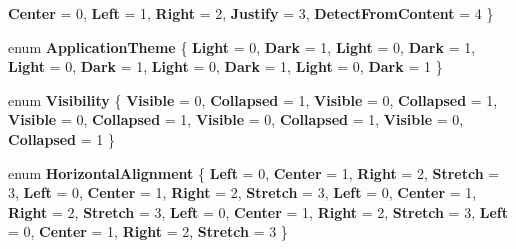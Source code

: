 \begin{DoxyCompactItemize}
{\bfseries Center} = 0, 
{\bfseries Left} = 1, 
{\bfseries Right} = 2, 
{\bfseries Justify} = 3, 
\newline
{\bfseries Detect\+From\+Content} = 4
 \}
\item 
\mbox{\label{namespace_windows_1_1_u_i_1_1_xaml_ace78659e508744cb10b2d252833ef022}} 
enum {\bfseries Application\+Theme} \{ \newline
{\bfseries Light} = 0, 
{\bfseries Dark} = 1, 
{\bfseries Light} = 0, 
{\bfseries Dark} = 1, 
\newline
{\bfseries Light} = 0, 
{\bfseries Dark} = 1, 
{\bfseries Light} = 0, 
{\bfseries Dark} = 1, 
\newline
{\bfseries Light} = 0, 
{\bfseries Dark} = 1
 \}
\item 
\mbox{\label{namespace_windows_1_1_u_i_1_1_xaml_ab3fbc626243929a7adbc7f2170933135}} 
enum {\bfseries Visibility} \{ \newline
{\bfseries Visible} = 0, 
{\bfseries Collapsed} = 1, 
{\bfseries Visible} = 0, 
{\bfseries Collapsed} = 1, 
\newline
{\bfseries Visible} = 0, 
{\bfseries Collapsed} = 1, 
{\bfseries Visible} = 0, 
{\bfseries Collapsed} = 1, 
\newline
{\bfseries Visible} = 0, 
{\bfseries Collapsed} = 1
 \}
\item 
\mbox{\label{namespace_windows_1_1_u_i_1_1_xaml_a296d6e339e45f69b5f76a1183a51fef6}} 
enum {\bfseries Horizontal\+Alignment} \{ \newline
{\bfseries Left} = 0, 
{\bfseries Center} = 1, 
{\bfseries Right} = 2, 
{\bfseries Stretch} = 3, 
\newline
{\bfseries Left} = 0, 
{\bfseries Center} = 1, 
{\bfseries Right} = 2, 
{\bfseries Stretch} = 3, 
\newline
{\bfseries Left} = 0, 
{\bfseries Center} = 1, 
{\bfseries Right} = 2, 
{\bfseries Stretch} = 3, 
\newline
{\bfseries Left} = 0, 
{\bfseries Center} = 1, 
{\bfseries Right} = 2, 
{\bfseries Stretch} = 3, 
\newline
{\bfseries Left} = 0, 
{\bfseries Center} = 1, 
{\bfseries Right} = 2, 
{\bfseries Stretch} = 3
 \}
\item 
\mbox{\label{namespace_windows_1_1_u_i_1_1_xaml_adfb3c11d5572410fe610ae02feb31cd1}} 

\end{DoxyCompactItemize}
